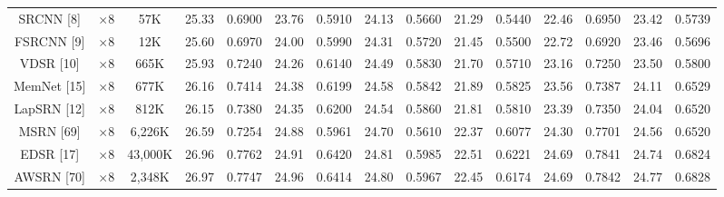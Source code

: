 \documentclass[twocolumn]{svjour3}          %
\begin{document}
\begin{table}
\begin{tabular}{|c|c|c|cc|cc|cc|cc|cc|cc|}
SRCNN [8] & $\times8$ &57K& \multicolumn{1}{c|}{25.33} & 0.6900 & \multicolumn{1}{c|}{23.76} &0.5910 &\multicolumn{1}{c|}{24.13} &0.5660 & \multicolumn{1}{c|}{21.29} &0.5440& \multicolumn{1}{c|}{22.46} &0.6950
&\multicolumn{1}{c|}{23.42} & 0.5739      \\

FSRCNN [9]& $\times8$&12K& \multicolumn{1}{c|}{25.60} &0.6970 & \multicolumn{1}{c|}{24.00} &0.5990&\multicolumn{1}{c|}{24.31} &0.5720 & \multicolumn{1}{c|}{21.45} &0.5500 & \multicolumn{1}{c|}{22.72} & 0.6920
&\multicolumn{1}{c|}{23.46} &  0.5696      \\

VDSR [10]& $\times8$&665K& \multicolumn{1}{c|}{25.93} &0.7240& \multicolumn{1}{c|}{24.26} &0.6140 &\multicolumn{1}{c|}{24.49} &0.5830 & \multicolumn{1}{c|}{21.70} &0.5710 & \multicolumn{1}{c|}{23.16} &0.7250
&\multicolumn{1}{c|}{23.50} & 0.5800       \\

MemNet [15]& $\times8$&677K& \multicolumn{1}{c|}{26.16} &  0.7414 & \multicolumn{1}{c|}{24.38} & 0.6199&\multicolumn{1}{c|}{24.58} & 0.5842 & \multicolumn{1}{c|}{21.89  } &0.5825 & \multicolumn{1}{c|}{23.56 } &0.7387
&\multicolumn{1}{c|}{24.11  } &  0.6529       \\

LapSRN [12]& $\times8$&812K& \multicolumn{1}{c|}{26.15} &0.7380& \multicolumn{1}{c|}{24.35} &0.6200 &\multicolumn{1}{c|}{24.54} &0.5860 & \multicolumn{1}{c|}{21.81} &0.5810 & \multicolumn{1}{c|}{23.39} &0.7350
&\multicolumn{1}{c|}{24.04} & 0.6520       \\

MSRN [69]& $\times8$&6,226K& \multicolumn{1}{c|}{26.59} &  0.7254 & \multicolumn{1}{c|}{24.88} & 0.5961&\multicolumn{1}{c|}{24.70} & 0.5610 & \multicolumn{1}{c|}{22.37 } & 0.6077 & \multicolumn{1}{c|}{24.30 } &0.7701 &\multicolumn{1}{c|}{24.56  } &  0.6520       \\

EDSR [17]& $\times8$&43,000K& \multicolumn{1}{c|}{26.96} &  0.7762 & \multicolumn{1}{c|}{24.91} & 0.6420&\multicolumn{1}{c|}{24.81} & 0.5985 & \multicolumn{1}{c|}{22.51  } &0.6221 & \multicolumn{1}{c|}{24.69 } &0.7841
&\multicolumn{1}{c|}{24.74  } &  0.6824       \\

AWSRN [70]& $\times8$&2,348K& \multicolumn{1}{c|}{26.97} &  0.7747 & \multicolumn{1}{c|}{24.96} & 0.6414&\multicolumn{1}{c|}{24.80} & 0.5967 & \multicolumn{1}{c|}{22.45  } &0.6174 & \multicolumn{1}{c|}{24.69 } &0.7842 &\multicolumn{1}{c|}{24.77  } &  0.6828       \\


\end{tabular}
\end{table}
\end{document}
